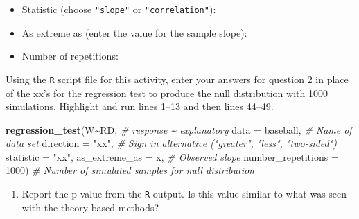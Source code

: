 \documentclass[
]{report}
\newenvironment{Shaded}{\begin{snugshade}}{\end{snugshade}}
\newcommand{\CommentTok}[1]{\textcolor[rgb]{0.56,0.35,0.01}{\textit{#1}}}
\newcommand{\DataTypeTok}[1]{\textcolor[rgb]{0.13,0.29,0.53}{#1}}
\newcommand{\DecValTok}[1]{\textcolor[rgb]{0.00,0.00,0.81}{#1}}
\newcommand{\KeywordTok}[1]{\textcolor[rgb]{0.13,0.29,0.53}{\textbf{#1}}}
\newcommand{\NormalTok}[1]{#1}
\newcommand{\OperatorTok}[1]{\textcolor[rgb]{0.81,0.36,0.00}{\textbf{#1}}}
\newcommand{\StringTok}[1]{\textcolor[rgb]{0.31,0.60,0.02}{#1}}
\providecommand{\tightlist}{%
  \setlength{\itemsep}{0pt}\setlength{\parskip}{0pt}}
\begin{document}
\vspace{.2in}

\begin{itemize}
\tightlist
\item
  Statistic (choose \texttt{"slope"} or \texttt{"correlation"}):
\end{itemize}

\vspace{.2in}

\begin{itemize}
\tightlist
\item
  As extreme as (enter the value for the sample slope):
\end{itemize}

\vspace{0.2in}

\begin{itemize}
\tightlist
\item
  Number of repetitions:
\end{itemize}

\vspace{.2in}

Using the \texttt{R} script file for this activity, enter your answers for question 2 in place of the xx's for the regression test to produce the null distribution with 1000 simulations. Highlight and run lines 1--13 and then lines 44--49.

\begin{Shaded}
\begin{Highlighting}[]
\KeywordTok{regression\_test}\NormalTok{(W}\OperatorTok{\textasciitilde{}}\NormalTok{RD, }\CommentTok{\# response \textasciitilde{} explanatory}
               \DataTypeTok{data =}\NormalTok{ baseball, }\CommentTok{\# Name of data set}
               \DataTypeTok{direction =} \StringTok{"xx"}\NormalTok{, }\CommentTok{\# Sign in alternative ("greater", "less", "two{-}sided")}
               \DataTypeTok{statistic =} \StringTok{"xx"}\NormalTok{, }
               \DataTypeTok{as\_extreme\_as =}\NormalTok{ x, }\CommentTok{\# Observed slope}
               \DataTypeTok{number\_repetitions =} \DecValTok{1000}\NormalTok{) }\CommentTok{\# Number of simulated samples for null distribution}
       
\end{Highlighting}
\end{Shaded}

\begin{enumerate}
\def\labelenumi{\arabic{enumi}.}
\setcounter{enumi}{2}
\tightlist
\item
  Report the p-value from the \texttt{R} output. Is this value similar to what was seen with the theory-based methods?
\end{enumerate}
\end{document}
